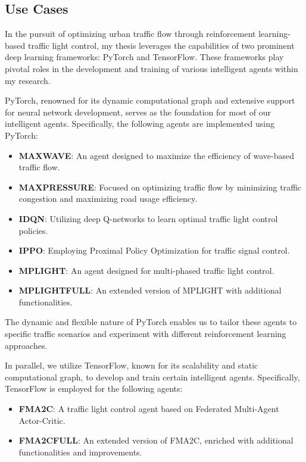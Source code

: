 \subsection{Use Cases}
In the pursuit of optimizing urban traffic flow through reinforcement learning-based traffic light control, my thesis leverages the capabilities of two prominent deep learning frameworks: PyTorch and TensorFlow. These frameworks play pivotal roles in the development and training of various intelligent agents within my research.

PyTorch, renowned for its dynamic computational graph and extensive support for neural network development, serves as the foundation for most of our intelligent agents. Specifically, the following agents are implemented using PyTorch:

\begin{itemize}
    \item \textbf{MAXWAVE}: An agent designed to maximize the efficiency of wave-based traffic flow.
    
    \item \textbf{MAXPRESSURE}: Focused on optimizing traffic flow by minimizing traffic congestion and maximizing road usage efficiency.
    
    \item \textbf{IDQN}: Utilizing deep Q-networks to learn optimal traffic light control policies.
    
    \item \textbf{IPPO}: Employing Proximal Policy Optimization for traffic signal control.
    
    \item \textbf{MPLIGHT}: An agent designed for multi-phased traffic light control.
    
    \item \textbf{MPLIGHTFULL}: An extended version of MPLIGHT with additional functionalities.
\end{itemize}

The dynamic and flexible nature of PyTorch enables us to tailor these agents to specific traffic scenarios and experiment with different reinforcement learning approaches.

In parallel, we utilize TensorFlow, known for its scalability and static computational graph, to develop and train certain intelligent agents. Specifically, TensorFlow is employed for the following agents:

\begin{itemize}
    \item \textbf{FMA2C}: A traffic light control agent based on Federated Multi-Agent Actor-Critic.
    
    \item \textbf{FMA2CFULL}: An extended version of FMA2C, enriched with additional functionalities and improvements.
\end{itemize}

